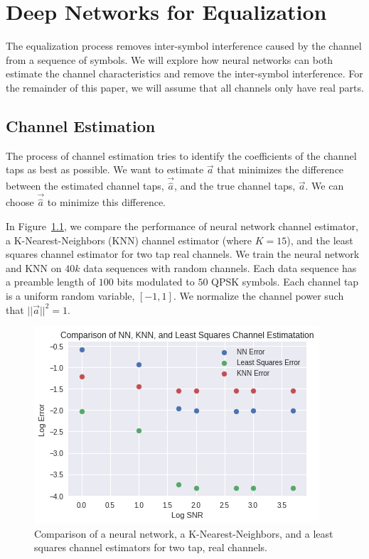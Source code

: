 \chapter[Deep Networks for Equalization]{Deep Networks for Equalization\raisebox{.3\baselineskip}{\normalsize\footnotemark}}

The equalization process removes inter-symbol interference caused by the channel from a sequence of symbols.  We will explore how neural networks can both estimate the channel characteristics and remove the inter-symbol interference.  For the remainder of this paper, we will assume that all channels only have real parts. 

\section{Channel Estimation}

The process of channel estimation tries to identify the coefficients of the channel taps as best as possible.  We want to estimate $\vec{a}$ that minimizes the difference between the estimated channel taps, $\vec{\hat{a}}$, and the true channel taps, $\vec{a}$.  We can choose $\vec{\hat{a}}$ to minimize this difference.

In Figure~\ref{fig:chann_est}, we compare the performance of neural network channel estimator, a K-Nearest-Neighbors (KNN) channel estimator (where $K=15$), and the least squares channel estimator for two tap real channels.
We train the neural network and KNN on $40k$ data sequences with random channels.  Each data sequence has a preamble length of $100$ bits modulated to $50$ QPSK symbols.  
Each channel tap is a uniform random variable, $[-1,1]$.  We normalize the channel power such that $||\vec{a}||^2 = 1$.  

\begin{figure}
\begin{center}
\includegraphics{figures/equal/Channel_Estimation_KNN_LSTSQ_NN.png}
\caption{Comparison of a neural network, a K-Nearest-Neighbors, and a least squares channel estimators for two tap, real channels.}
\label{fig:chann_est}
\end{center}
\end{figure}


